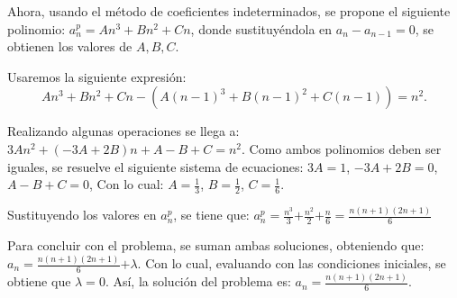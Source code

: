 \documentclass{article}
\begin{document}
Ahora, usando el método de coeficientes indeterminados, se propone el
siguiente polinomio: $a^p_n=An^3+Bn^2+Cn$, donde sustituyéndola en
$a_n-a_{n-1}=0$, se obtienen los valores de $A,B,C$.

Usaremos la siguiente expresión:
\begin{equation}
  \label{polinomial}
   An^3+Bn^2+Cn-(A(n-1)^3+B(n-1)^2+C(n-1))=n^2.  
\end{equation}

Realizando algunas operaciones se llega a:
$3An^2+(-3A+2B)n+A-B+C=n^2$.
Como ambos polinomios deben ser iguales, se resuelve el siguiente sistema de ecuaciones:
$3A=1$,
$-3A+2B=0$,
$A-B+C=0$,
Con lo cual: $A=\frac{1}{3}$, $B=\frac{1}{2}$, $C=\frac{1}{6}$.

Sustituyendo los valores en $a^p_n$, se tiene que:
$a^p_n=\frac{n^3}{3}$$+\frac{n^2}{2}$$+\frac{n}{6}=$$\frac{n(n+1)(2n+1)}{6}$

Para concluir con el problema, se suman ambas soluciones, obteniendo que:
$a_n=\frac{n(n+1)(2n+1)}{6}$$+\lambda$.
Con lo cual, evaluando con las condiciones iniciales, se obtiene que $\lambda$$=0$.
Así, la solución del problema es:
$a_n=\frac{n(n+1)(2n+1)}{6}$.
\end{document}
